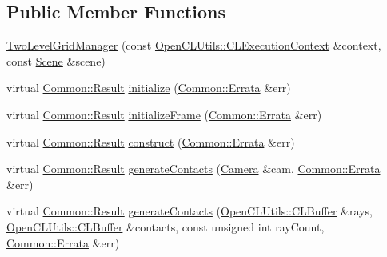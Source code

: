 \subsection*{Public Member Functions}
\begin{DoxyCompactItemize}
\item 
\hyperlink{class_c_l_ray_tracer_1_1_acceleration_structures_1_1_two_level_grid_manager_ab91e464f681a2287febdb27674b82d2b}{Two\+Level\+Grid\+Manager} (const \hyperlink{class_c_l_ray_tracer_1_1_open_c_l_utils_1_1_c_l_execution_context}{Open\+C\+L\+Utils\+::\+C\+L\+Execution\+Context} \&context, const \hyperlink{class_c_l_ray_tracer_1_1_scene}{Scene} \&scene)
\item 
virtual \hyperlink{_errata_8h_a389396702f1aff6e71eb21328b0775c1}{Common\+::\+Result} \hyperlink{class_c_l_ray_tracer_1_1_acceleration_structures_1_1_two_level_grid_manager_a98f2e5e78e14ebd09f23304b730d1696}{initialize} (\hyperlink{class_c_l_ray_tracer_1_1_common_1_1_errata}{Common\+::\+Errata} \&err)
\item 
virtual \hyperlink{_errata_8h_a389396702f1aff6e71eb21328b0775c1}{Common\+::\+Result} \hyperlink{class_c_l_ray_tracer_1_1_acceleration_structures_1_1_two_level_grid_manager_a08dc7569f318a9422d69547331a31f16}{initialize\+Frame} (\hyperlink{class_c_l_ray_tracer_1_1_common_1_1_errata}{Common\+::\+Errata} \&err)
\item 
virtual \hyperlink{_errata_8h_a389396702f1aff6e71eb21328b0775c1}{Common\+::\+Result} \hyperlink{class_c_l_ray_tracer_1_1_acceleration_structures_1_1_two_level_grid_manager_a21edb29908807e8f2ba8c97d79758e05}{construct} (\hyperlink{class_c_l_ray_tracer_1_1_common_1_1_errata}{Common\+::\+Errata} \&err)
\item 
virtual \hyperlink{_errata_8h_a389396702f1aff6e71eb21328b0775c1}{Common\+::\+Result} \hyperlink{class_c_l_ray_tracer_1_1_acceleration_structures_1_1_two_level_grid_manager_a6a9f7a79568bfeb475a1ae9e1f88439d}{generate\+Contacts} (\hyperlink{struct_camera}{Camera} \&cam, \hyperlink{class_c_l_ray_tracer_1_1_common_1_1_errata}{Common\+::\+Errata} \&err)
\item 
virtual \hyperlink{_errata_8h_a389396702f1aff6e71eb21328b0775c1}{Common\+::\+Result} \hyperlink{class_c_l_ray_tracer_1_1_acceleration_structures_1_1_two_level_grid_manager_a186e22b86431d2b1c0fb92775bf6494b}{generate\+Contacts} (\hyperlink{class_c_l_ray_tracer_1_1_open_c_l_utils_1_1_c_l_buffer}{Open\+C\+L\+Utils\+::\+C\+L\+Buffer} \&rays, \hyperlink{class_c_l_ray_tracer_1_1_open_c_l_utils_1_1_c_l_buffer}{Open\+C\+L\+Utils\+::\+C\+L\+Buffer} \&contacts, const unsigned int ray\+Count, \hyperlink{class_c_l_ray_tracer_1_1_common_1_1_errata}{Common\+::\+Errata} \&err)

\end{DoxyCompactItemize}
